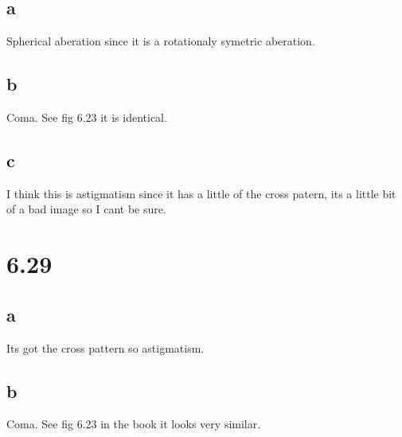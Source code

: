 \documentclass[12pt,a4paper]{article}
\begin{document}
\subsection{a}
Spherical aberation since it is a rotationaly symetric aberation.
\subsection{b}
Coma.  See fig 6.23 it is identical.
\subsection{c}
I think this is astigmatism since it has a little of the cross patern, its a little bit of a bad image so I cant be sure.
\section{6.29}
\subsection{a}
Its got the cross pattern so astigmatism.
\subsection{b}
Coma.  See fig 6.23 in the book it looks very similar.
\end{document}
